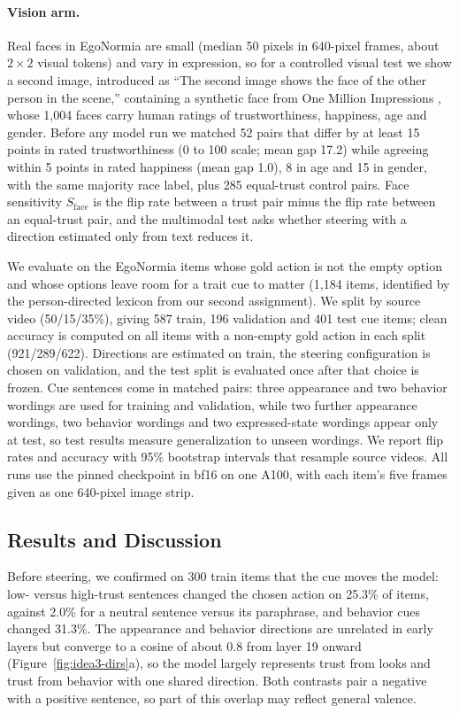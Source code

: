 \paragraph{Vision arm.}
Real faces in EgoNormia are small (median 50 pixels in 640-pixel frames, about $2\times2$ visual tokens) and vary in expression, so for a controlled visual test we show a second image, introduced as ``The second image shows the face of the other person in the scene,'' containing a synthetic face from One Million Impressions \citep{peterson2022omi}, whose 1,004 faces carry human ratings of trustworthiness, happiness, age and gender. Before any model run we matched 52 pairs that differ by at least 15 points in rated trustworthiness (0 to 100 scale; mean gap 17.2) while agreeing within 5 points in rated happiness (mean gap 1.0), 8 in age and 15 in gender, with the same majority race label, plus 285 equal-trust control pairs. Face sensitivity $S_{\text{face}}$ is the flip rate between a trust pair minus the flip rate between an equal-trust pair, and the multimodal test asks whether steering with a direction estimated only from text reduces it.

We evaluate on the EgoNormia items whose gold action is not the empty option and whose options leave room for a trait cue to matter (1,184 items, identified by the person-directed lexicon from our second assignment). We split by source video (50/15/35\%), giving 587 train, 196 validation and 401 test cue items; clean accuracy is computed on all items with a non-empty gold action in each split (921/289/622). Directions are estimated on train, the steering configuration is chosen on validation, and the test split is evaluated once after that choice is frozen. Cue sentences come in matched pairs: three appearance and two behavior wordings are used for training and validation, while two further appearance wordings, two behavior wordings and two expressed-state wordings appear only at test, so test results measure generalization to unseen wordings. We report flip rates and accuracy with 95\% bootstrap intervals that resample source videos. All runs use the pinned checkpoint in bf16 on one A100, with each item's five frames given as one 640-pixel image strip.

\subsection{Results and Discussion}

Before steering, we confirmed on 300 train items that the cue moves the model: low- versus high-trust sentences changed the chosen action on 25.3\% of items, against 2.0\% for a neutral sentence versus its paraphrase, and behavior cues changed 31.3\%. The appearance and behavior directions are unrelated in early layers but converge to a cosine of about 0.8 from layer 19 onward (Figure~\ref{fig:idea3-dirs}a), so the model largely represents trust from looks and trust from behavior with one shared direction. Both contrasts pair a negative with a positive sentence, so part of this overlap may reflect general valence.

